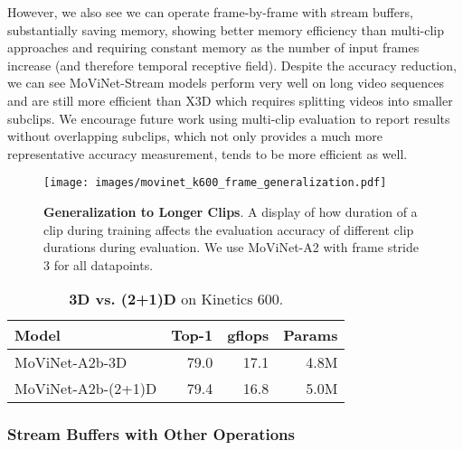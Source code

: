 \documentclass[final]{cvpr}
\newcommand{\ournet}{MoViNet\xspace} \newcommand{\ournets}{\ournet{}s\xspace}
\begin{document}
However, we also see we can operate frame-by-frame with stream buffers, substantially saving memory, showing better memory efficiency than multi-clip approaches and requiring constant memory as the number of input frames increase (and therefore temporal receptive field).
Despite the accuracy reduction, we can see \ournet-Stream models perform very well on long video sequences and are still more efficient than X3D which requires splitting videos into smaller subclips.
We encourage future work using multi-clip evaluation to report results without overlapping subclips, which not only provides a much more representative accuracy measurement, tends to be more efficient as well.

\begin{figure}[t]
    \begin{center}
    \texttt{[image: images/movinet\_k600\_frame\_generalization.pdf]}
    \end{center}
    \caption{
        {\bf Generalization to Longer Clips}. 
        A display of how duration of a clip during training affects the evaluation accuracy of different clip durations during evaluation. 
        We use \ournet-A2 with frame stride 3 for all datapoints.
    }
    \label{fig:frame-generalization}
\end{figure}







\begin{table}[tbp]
    \footnotesize
    \begin{center}
    \begin{tabularx}{\columnwidth}{@{}Xrrr@{}}
    \toprule
        \sc Model & \sc Top-1 & \sc gflops & \sc Params \\
    \midrule
        \ournet-A2b-3D & 79.0 & 17.1 & 4.8M \\
        \ournet-A2b-(2+1)D & 79.4 & 16.8 & 5.0M \\
    \bottomrule
    \end{tabularx}
    \end{center}
    \caption{
        {\bf 3D vs. (2+1)D} on Kinetics 600.
    }
    \label{table:2p1d-vs-3d}
\end{table}


\subsubsection{Stream Buffers with Other Operations}
\end{document}
